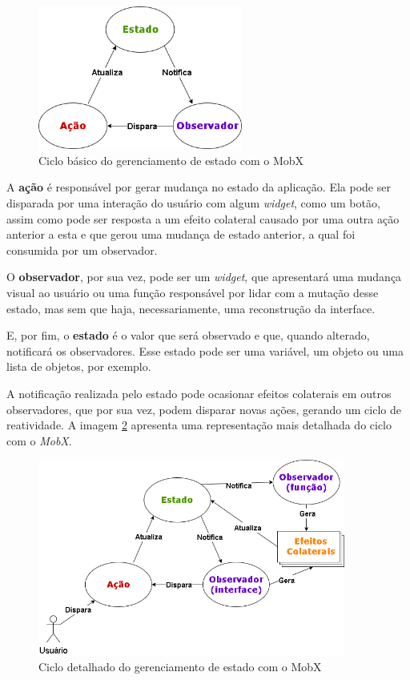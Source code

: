 \begin{figure}[!ht]
  \centering
  \includegraphics[width=0.6\textwidth]{figuras/cap2/2_2_6_mobx-cycle.png}
  \caption{Ciclo básico do gerenciamento de estado com o MobX \protect\cite{mobx-package} \protect\cite{podila18mobx}}
  \label{fig:mobx-cycle}
\end{figure}


A \textbf{ação} é responsável por gerar mudança no estado da aplicação. Ela pode ser disparada por uma interação do usuário com algum \textit{widget}, como um botão, assim como pode ser resposta a um efeito colateral causado por uma outra ação anterior a esta e que gerou uma mudança de estado anterior, a qual foi consumida por um observador.

O \textbf{observador}, por sua vez, pode ser um \textit{widget}, que apresentará uma mudança visual ao usuário ou uma função responsável por lidar com a mutação desse estado, mas sem que haja, necessariamente, uma reconstrução da interface.

E, por fim, o \textbf{estado} é o valor que será observado e que, quando alterado, notificará os observadores. Esse estado pode ser uma variável, um objeto ou uma lista de objetos, por exemplo.

A notificação realizada pelo estado pode ocasionar efeitos colaterais em outros observadores, que por sua vez, podem disparar novas ações, gerando um ciclo de reatividade. A imagem \ref{fig:mobx-details} apresenta uma representação mais detalhada do ciclo com o \textit{MobX}.

\begin{figure}[!ht]
  \centering
  \includegraphics[width=0.9\textwidth]{figuras/cap2/2_2_6_mobx-details.png}
  \caption{Ciclo detalhado do gerenciamento de estado com o MobX \protect\cite{mobx-package} \protect\cite{podila18mobx}}
  \label{fig:mobx-details}
\end{figure}

